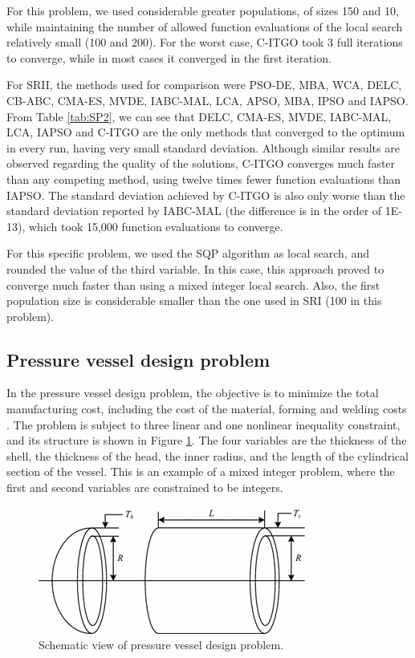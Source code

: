 For this problem, we used considerable greater populations, of sizes 150 and 10, while maintaining the number of allowed function evaluations of the local search relatively small (100 and 200). For the worst case, C-ITGO took 3 full iterations to converge, while in most cases it converged in the first iteration.

For SRII, the methods used for comparison were PSO-DE, MBA, WCA, DELC, CB-ABC, CMA-ES, MVDE, IABC-MAL, LCA, APSO, MBA, IPSO and IAPSO. From Table \ref{tab:SP2}, we can see that DELC, CMA-ES, MVDE, IABC-MAL, LCA, IAPSO and C-ITGO are the only methods that converged to the optimum in every run, having very small standard deviation. Although similar results are observed regarding the quality of the solutions, C-ITGO converges much faster than any competing method, using twelve times fewer function evaluations than IAPSO. The standard deviation achieved by C-ITGO is also only worse than the standard deviation reported by IABC-MAL (the difference is in the order of 1E-13), which took 15,000 function evaluations to converge.



For this specific problem, we used the SQP algorithm as local search, and rounded the value of the third variable. In this case, this approach proved to converge much faster than using a mixed integer local search. Also, the first population size is considerable smaller than the one used in SRI (100 in this problem).



\subsection{Pressure vessel design problem}

In the pressure vessel design problem, the objective is to minimize the total manufacturing cost, including the cost of the material, forming and welding costs \citep{PV}. The problem is subject to three linear and one nonlinear inequality constraint, and its structure is shown in Figure \ref{fig:PV}. The four variables are the thickness of the shell, the thickness of the head, the inner radius, and the length of the cylindrical section of the vessel. This is an example of a mixed integer problem, where the first and second variables are constrained to be integers.


\begin{figure}[h]
\begin{center}
\includegraphics[scale=0.6]{Imgs/PV.png}
\end{center}
\captionsetup{justification=centering}
\caption{Schematic view of pressure vessel design problem.}\label{fig:PV}
\end{figure}


